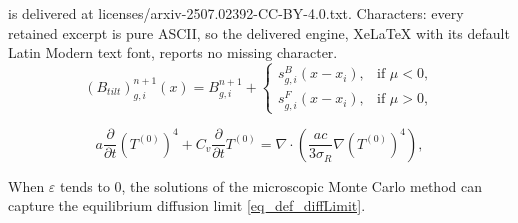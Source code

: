 \documentclass[10pt,a4paper]{amsart}
\newcommand{\pdrv}[2]{\frac{\partial{#1}}{\partial{#2}}}
\begin{document}
is delivered at licenses/arxiv-2507.02392-CC-BY-4.0.txt. Characters: every retained excerpt is pure ASCII, so the delivered engine, XeLaTeX with its default Latin Modern text font, reports no missing character.
\begin{equation}\label{eq_sourceTilting}
(B_{tilt})^{n+1}_{g,i}(x) = B^{n+1}_{g,i} + 
\begin{cases} 
s^{B}_{g,i } \left( x - x_i \right), & \text{if } \mu < 0, \\
s^{F}_{g,i } \left( x - x_i \right), & \text{if } \mu > 0,
\end{cases}
\end{equation}

		\begin{equation}\label{eq_def_diffLimit}
			a \pdrv{}{t} (T^{(0)})^4 + C_v \pdrv{}{t}T^{(0)} = \nabla \cdot \left( \frac{ac}{3 \sigma_R} \nabla (T^{(0)})^4 \right),
		\end{equation}

\begin{proposition}
    When $\varepsilon$ tends to $0$, the solutions of the microscopic Monte Carlo method can capture the equilibrium diffusion limit \eqref{eq_def_diffLimit}.
\end{proposition}
\end{document}
